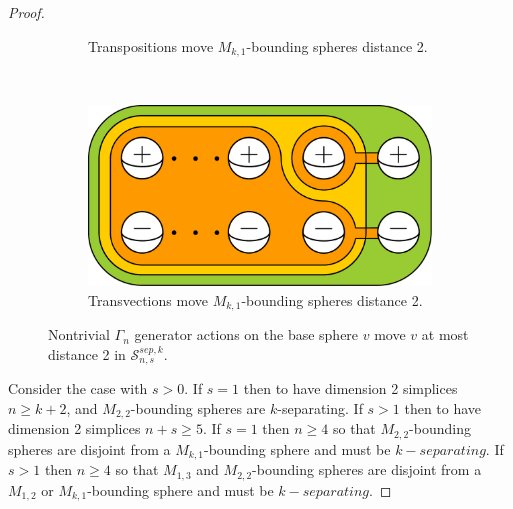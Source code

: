 \documentclass[11pt]{article}
\theoremstyle{remark}
\theoremstyle{definition}
\begin{document}
\begin{proof}
\begin{figure}[b!]
\begin{subfigure}[b]{0.4\textwidth}
        \caption{Transpositions move $M_{k,1}$-bounding spheres distance 2.}
        \label{fig:kput0}
    \end{subfigure}
    ~
    \begin{subfigure}[b]{0.4\textwidth}
        \includegraphics[width=\textwidth]{figures/kput1.pdf}
        \caption{Transvections move $M_{k,1}$-bounding spheres distance 2.}
        \label{fig:kput1}
    \end{subfigure}
    \caption{Nontrivial $\Gamma_n$ generator actions on the base sphere $v$
    move $v$ at most distance 2 in $\mathcal S^{sep,k}_{n,s}$.}
    \label{fig:kput01}
\end{figure}

Consider the case with $s>0$.
If
$s=1$
then to have dimension 2 simplices $n \geq k+2$,
and $M_{2,2}$-bounding spheres are $k$-separating.
If
$s>1$
then to have dimension 2 simplices $n+s\geq 5$.
If $s=1$ then $n \geq 4$
so that $M_{2,2}$-bounding spheres are disjoint from a
$M_{k,1}$-bounding sphere and must be $k-separating$.
If $s>1$ then $n \geq 4$
so that $M_{1,3}$ and $M_{2,2}$-bounding spheres are disjoint from a
$M_{1,2}$ or $M_{k,1}$-bounding sphere and must be $k-separating$.



\end{proof}
\end{document}

